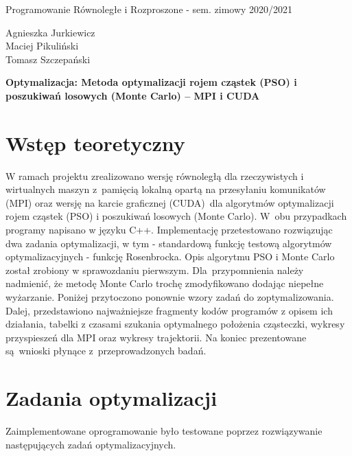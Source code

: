 \documentclass[11pt, a4paper, oneside]{article}
\begin{document}
\hspace*{-\parindent}%
\begin{minipage}{\textwidth}
  \begin{minipage}{.7\textwidth}
   \begin{flushleft}
	Programowanie Równoległe i Rozproszone - sem. zimowy 2020/2021
	\end{flushleft}
  \end{minipage}
  \begin{minipage}{.3\textwidth}
    \begin{flushright}
	Agnieszka Jurkiewicz \\
	Maciej Pikuliński \\
	Tomasz Szczepański
	\end{flushright}
  \end{minipage}%
\end{minipage}
\begin{center}
{\Large \textbf{Optymalizacja: Metoda optymalizacji rojem cząstek (PSO) i poszukiwań losowych (Monte Carlo) -- MPI i CUDA}}
\end{center}

\section{Wstęp teoretyczny}
 W ramach projektu zrealizowano wersję równoległą dla rzeczywistych i wirtualnych maszyn z~pamięcią lokalną opartą na przesyłaniu komunikatów (MPI) oraz wersję na karcie graficznej (CUDA)~dla algorytmów optymalizacji rojem cząstek (PSO) i poszukiwań losowych (Monte Carlo). W~obu przypadkach programy napisano w języku C++. Implementację przetestowano rozwiązując dwa zadania optymalizacji, w tym - standardową funkcję testową algorytmów optymalizacyjnych - funkcję Rosenbrocka. Opis algorytmu PSO i Monte Carlo został zrobiony w sprawozdaniu pierwszym. Dla~przypomnienia należy nadmienić, że metodę Monte Carlo trochę zmodyfikowano dodając niepełne wyżarzanie. Poniżej przytoczono ponownie wzory zadań do zoptymalizowania. Dalej, przedstawiono najważniejsze fragmenty kodów programów z opisem ich działania, tabelki z czasami szukania optymalnego położenia cząsteczki, wykresy przyspieszeń dla MPI oraz wykresy trajektorii. Na koniec prezentowane są~wnioski płynące z~przeprowadzonych badań.

\section{Zadania optymalizacji}
Zaimplementowane oprogramowanie było testowane poprzez rozwiązywanie następujących zadań optymalizacyjnych.
\end{document}
